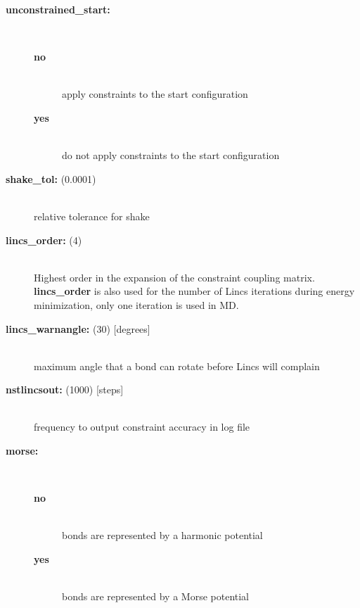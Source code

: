 \begin{description}
\item[{\bf unconstrained\_start:}]\mbox{}\\
\vspace{-2ex}\begin{description}
\item[{\bf no}]\mbox{}\\
apply constraints to the start configuration
\item[{\bf yes}]\mbox{}\\
do not apply constraints to the start configuration
\end{description}
\item[{\bf shake\_tol: }(0.0001)]\mbox{}\\
relative tolerance for shake
\item[{\bf lincs\_order: }(4)]\mbox{}\\
Highest order in the expansion of the constraint coupling matrix.
{\bf lincs\_order} is also used for the number of Lincs iterations
during energy minimization, only one iteration is used in MD.
\item[{\bf lincs\_warnangle: }(30) {[degrees]}]\mbox{}\\
maximum angle that a bond can rotate before Lincs will complain
\item[{\bf nstlincsout: }(1000) {[steps]}]\mbox{}\\
frequency to output constraint accuracy in log file
\item[{\bf morse:}]\mbox{}\\
\vspace{-2ex}\begin{description}
\item[{\bf no}]\mbox{}\\
bonds are represented by a harmonic potential
\item[{\bf yes}]\mbox{}\\
bonds are represented by a Morse potential
\end{description}
\end{description}

